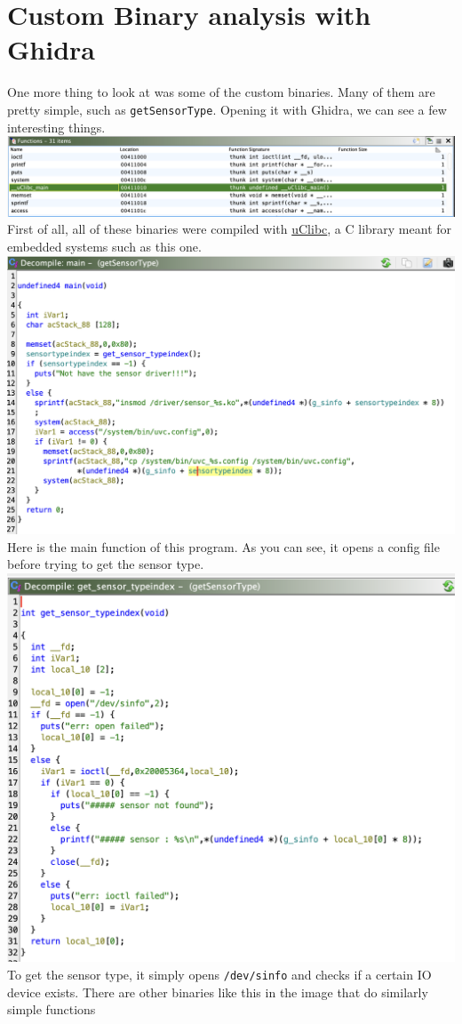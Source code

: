 \documentclass[a4paper, 11pt]{article}
\begin{document}
\section{Custom Binary analysis with Ghidra}
One more thing to look at was some of the custom binaries. Many of them are pretty simple, such as \verb|getSensorType|. Opening it with Ghidra, we can see a few interesting things.\newline
\includegraphics[scale=0.5]{uclib}\newline
First of all, all of these binaries were compiled with \href{https://www.uclibc.org/}{uClibc}, a C library meant for embedded systems such as this one.\newline
\includegraphics[scale=0.5]{main}\newline
Here is the main function of this program. As you can see, it opens a config file before trying to get the sensor type.\newline
\includegraphics[scale=0.5]{sensortype}\newline
To get the sensor type, it simply opens \verb|/dev/sinfo| and checks if a certain IO device exists. There are other binaries like this in the image that do similarly simple functions
\end{document}
